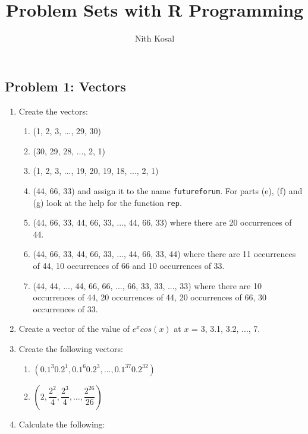 \documentclass[11pt,a4paper]{article}
\author{Nith Kosal}
\title{Problem Sets with R Programming}
\begin{document}
	\maketitle
	
\subsection*{Problem 1: Vectors}	

\begin{enumerate}
	\item Create the vectors: 
	\begin{enumerate}
		\item (1, 2, 3, ..., 29, 30)
		\item (30, 29, 28, ..., 2, 1)
		\item (1, 2, 3, ..., 19, 20, 19, 18, ..., 2, 1)
		\item (44, 66, 33) and assign it to the name \texttt{futureforum}. 
		For parts (e), (f) and (g) look at the help for the function \texttt{rep}.
		
		\item (44, 66, 33, 44, 66, 33, ..., 44, 66, 33) where there are 20 occurrences of 44.
		\item (44, 66, 33, 44, 66, 33, ..., 44, 66, 33, 44) where there are 11 occurrences of 44, 10 occurrences of 66 and 10 occurrences of 33.
		\item (44, 44, ..., 44, 66, 66, ..., 66, 33, 33, ..., 33) where there are 10 occurrences of 44, 20 occurrences of 44, 20 occurrences of 66, 30 occurrences of 33. 
		
	\end{enumerate}
    \item Create a vector of the value of $e^{x}cos(x)$ at $x$ = 3, 3.1, 3.2, ..., 7.

    \item Create the following vectors: 
	\setlength\columnsep{0cm}
	
	\begin{multicols}{2}
		\begin{enumerate}
			\everymath{\displaystyle}  
			\item $(0.1^{3}0.2^{1}, 0.1^{6}0.2^{3}, ..., 0.1^{37}0.2^{32})$
			\item $(2, \dfrac{2^{2}}{4}, \dfrac{2^{3}}{4}, ..., \dfrac{2^{26}}{26})$ 
		\end{enumerate}
	\end{multicols}
	
	\item Calculate the following: 
	\setlength\columnsep{0cm}
	

\end{enumerate}
\end{document}
